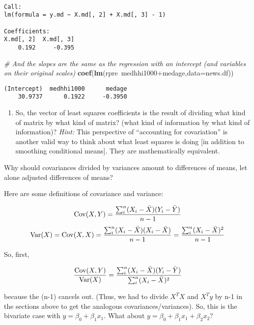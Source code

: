 \documentclass[10pt,]{article}
\newenvironment{Shaded}{\begin{snugshade}}{\end{snugshade}}
\newcommand{\KeywordTok}[1]{\textcolor[rgb]{0.13,0.29,0.53}{\textbf{{#1}}}}
\newcommand{\DataTypeTok}[1]{\textcolor[rgb]{0.13,0.29,0.53}{{#1}}}
\newcommand{\CommentTok}[1]{\textcolor[rgb]{0.56,0.35,0.01}{\textit{{#1}}}}
\newcommand{\NormalTok}[1]{{#1}}
\providecommand{\tightlist}{%
  \setlength{\itemsep}{0pt}\setlength{\parskip}{0pt}}
\begin{document}
\begin{verbatim}

Call:
lm(formula = y.md ~ X.md[, 2] + X.md[, 3] - 1)

Coefficients:
X.md[, 2]  X.md[, 3]  
    0.192     -0.395  
\end{verbatim}

\begin{Shaded}
\begin{Highlighting}[]
\CommentTok{# And the slopes are the same as the regression with an intercept (and variables on their original scales)}
\KeywordTok{coef}\NormalTok{(}\KeywordTok{lm}\NormalTok{(rpre~medhhi1000+medage,}\DataTypeTok{data=}\NormalTok{news.df))}
\end{Highlighting}
\end{Shaded}

\begin{verbatim}
(Intercept)  medhhi1000      medage 
    30.9737      0.1922     -0.3950 
\end{verbatim}

\begin{enumerate}
\def\labelenumi{\arabic{enumi}.}
\setcounter{enumi}{5}
\tightlist
\item
  So, the vector of least squares coefficients is the result of dividing
  what kind of matrix by what kind of matrix? (what kind of information
  by what kind of information)? \emph{Hint:} This perspective of
  ``accounting for covariation'' is another valid way to think about
  what least squares is doing {[}in addition to smoothing conditional
  means{]}. They are mathematically equivalent.
\end{enumerate}

Why should covariances divided by variances amount to differences of
means, let alone adjusted differences of means?

Here are some definitions of covariance and variance:

\[\mathrm{Cov}(X,Y)=\frac{\sum_{i}^{n}(X_i - \bar{X})(Y_i - \bar{Y})}{n-1} \]
\[\mathrm{Var}(X)=\mathrm{Cov}(X,X)=\frac{\sum_{i}^{n}(X_i - \bar{X})(X_i - \bar{X})}{n-1}=\frac{\sum_{i}^{n}(X_i - \bar{X})^2}{n-1}
\]

So, first,

\[\frac{\mathrm{Cov}(X,Y)}{\mathrm{Var}(X)}=\frac{\sum_{i}^{n}(X_i -
  \bar{X})(Y_i - \bar{Y})}{\sum_{i}^{n}(X_i - \bar{X})^2}\]

because the (n-1) cancels out. (Thus, we had to divide \(X^{T}X\) and
\(X^{T}y\) by n-1 in the sections above to get the analogous
covariances/variances). So, this is the bivariate case with
\(y=\beta_0+\beta_1 x_1\). What about
\(y=\beta_0+\beta_1 x_1+ \beta_2 x_2\)?
\end{document}
